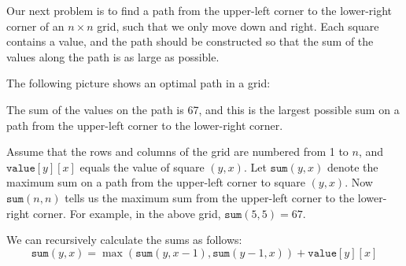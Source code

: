 Our next problem is to find a path
from the upper-left corner to
the lower-right corner
of an $n \times n$ grid, such that
we only move down and right.
Each square contains a value,
and the path should be constructed so
that the sum of the values along
the path is as large as possible.

The following picture shows an optimal
path in a grid:
\begin{center}
\end{center}
The sum of the values on the path is 67,
and this is the largest possible sum on a path
from the
upper-left corner to the lower-right corner.

Assume that the rows and columns of the
grid are numbered from 1 to $n$,
and $\texttt{value}[y][x]$ equals the value
of square $(y,x)$.
Let $\texttt{sum}(y,x)$ denote the maximum
sum on a path from the upper-left corner
to square $(y,x)$.
Now $\texttt{sum}(n,n)$ tells us
the maximum sum
from the upper-left corner to
the lower-right corner.
For example, in the above grid,
$\texttt{sum}(5,5)=67$.

We can recursively calculate the sums
as follows:
\[ \texttt{sum}(y,x) = \max(\texttt{sum}(y,x-1),\texttt{sum}(y-1,x))+\texttt{value}[y][x]\]


